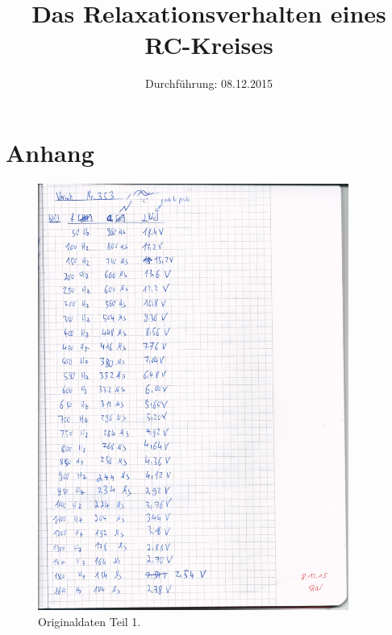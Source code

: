 

\subject{Versuchsprotokoll zum Versuch Nr. 353}
\title{Das Relaxationsverhalten eines RC-Kreises}
\date{
  Durchführung: 08.12.2015
}



\maketitle
\thispagestyle{empty}
\tableofcontents
\newpage






\section{Anhang}
\begin{figure}[H]
  \centering
  \includegraphics[height=14cm]{original1.png}
  \caption{Originaldaten Teil 1.}
  \label{fig:original1}
\end{figure}

